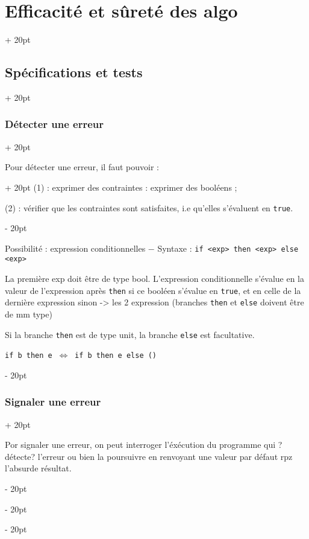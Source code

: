 \documentclass[a4paper, 12pt, twoside]{article}
\newcommand{\ssi}{\ \Leftrightarrow \ }
\newcommand{\ind}[1][20pt]{\advance\leftskip + #1}
\newcommand{\deind}[1][20pt]{\advance\leftskip - #1}
\newenvironment{indentedenv}[1][20pt]{\par \ind[#1]}{\par \deind}
\newenvironment{indt}[2][20pt]{#2 \begin{indentedenv}[#1]}{\end{indentedenv}} %
\begin{document}
\begin{indt}{\section{Efficacité et sûreté des algo}}
\begin{indt}{\subsection{Spécifications et tests}}
            \vspace{12pt}
            
            \begin{indt}{\subsubsection{Détecter une erreur}}
                
                \begin{indt}{Pour détecter une erreur, il faut pouvoir :}
                    (1) : exprimer des contraintes : exprimer des booléens ;
                    
                    (2) : vérifier que les contraintes sont satisfaites, i.e qu'elles s'évaluent en \texttt{true}.
                \end{indt}
                
                \vspace{6pt}
                
                Possibilité : expression conditionnelles $-$ Syntaxe :
                \texttt{if <exp> then <exp> else <exp>}
                
                La première exp doit être de type bool. L'expression conditionnelle s'évalue en la valeur de l'expression après \texttt{then} si ce booléen s'évalue en \texttt{true}, et en celle de la dernière expression sinon -> les 2 expression (branches \texttt{then} et \texttt{else} doivent être de mm type)
                
                Si la branche \texttt{then} est de type unit, la branche \texttt{else} est facultative.
                
                \texttt{if b then e} $\ssi$ \texttt{if b then e else ()}
                
                
            \end{indt}
            
            \vspace{12pt}
            
            \begin{indt}{\subsubsection{Signaler une erreur}}
                
                Por signaler une erreur, on peut interroger l'éxécution du programme qui ?détecte? l'erreur ou bien la poursuivre en renvoyant une valeur par défaut rpz l'absurde résultat.
                

\end{indt}
\end{indt}
\end{indt}
\end{document}
